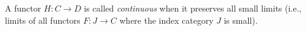 A functor $H : C \rightarrow D$ is called \textit{continuous} when it preserves all small limits (i.e., limits of all functors $F : J \rightarrow C$ where the index category $J$ is small).
